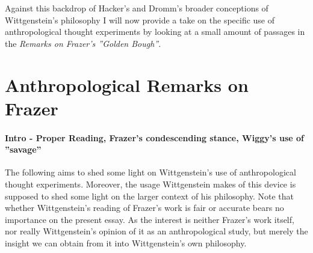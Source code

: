 \documentclass{article}
\begin{document}
Against this backdrop of Hacker's and Dromm's broader conceptions of Wittgenstein's philosophy I will now provide a take on the specific use of anthropological thought experiments by looking at a small amount of passages in the \textit{Remarks on Frazer's ''Golden Bough''}.

\section{Anthropological Remarks on Frazer}
\paragraph{Intro - Proper Reading, Frazer's condescending stance, Wiggy's use of ''savage''}
The following aims to shed some light on Wittgenstein's use of anthropological thought experiments. Moreover, the usage Wittgenstein makes of this device is supposed to shed some light on the larger context of his philosophy. Note that whether Wittgenstein's reading of Frazer's work is fair or accurate bears no importance on the present essay. As the interest is neither Frazer's work itself, nor really Wittgenstein's opinion of it as an anthropological study, but merely the insight we can obtain from it into Wittgenstein's own philosophy. 
\end{document}
